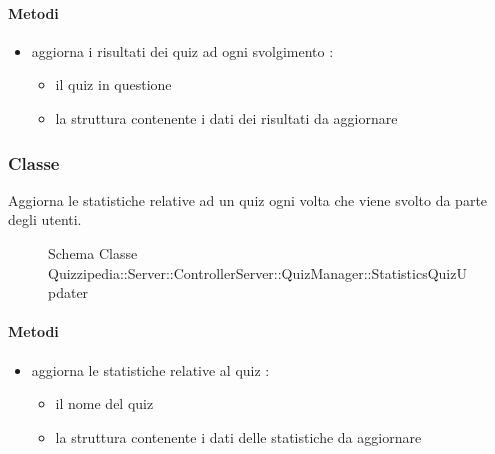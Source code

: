 \paragraph{Metodi}
\begin{itemize}
\item {}
\newline
aggiorna i risultati dei quiz ad ogni svolgimento
\newline
{} :
\begin{itemize}
\item {}
\newline
il quiz in questione
\item {}
\newline
la struttura contenente i dati dei risultati da aggiornare
\end{itemize}
\end{itemize}
\subsubsection{Classe }
Aggiorna le statistiche relative ad un quiz ogni volta che viene svolto da parte degli utenti.
\begin{figure}[H]
\centering
\noindent{}
\caption[Schema Classe StatisticsQuizUpdater]{Schema Classe Quizzipedia::Server::ControllerServer::QuizManager::StatisticsQuizUpdater}
\end{figure}
\paragraph{Metodi}
\begin{itemize}
\item {}
\newline
aggiorna le statistiche relative al quiz
\newline
{} :
\begin{itemize}
\item {}
\newline
il nome del quiz
\item {}
\newline
la struttura contenente i dati delle statistiche da aggiornare
\end{itemize}
\end{itemize}
